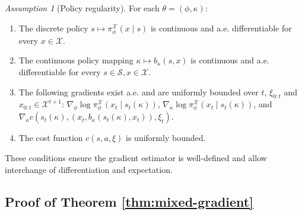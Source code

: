 \documentclass{article}
\theoremstyle{definition}
\theoremstyle{remark}
\newtheorem{assumption}{Assumption}
\begin{document}
\begin{assumption}[Policy regularity]
\label{ass:policy-regularity}
For each $\theta=(\phi,\kappa)$:
\begin{enumerate}
\vspace{-0.2cm}
\setlength{\itemsep}{2pt}
\setlength{\parskip}{0pt}
\setlength{\parsep}{0pt}
    \item The discrete policy $s \mapsto \pi^{\mathcal X}_{\phi}(x \mid s)$ is continuous and a.e. differentiable for every $x\in\mathcal X$.
    \item The continuous policy mapping $\kappa \mapsto b_\kappa(s, x)$ is continuous and a.e. differentiable for every $s \in \mathcal{S}, x\in\mathcal X$.
    \item The following gradients exist a.e. and are uniformly bounded over $t$, $\xi_{0:t}$ and $x_{0:t} \in \mathcal X^{t+1}$:
$\nabla_\phi \log \pi^{\mathcal X}_{\phi}(x_t \mid s_t(\kappa))$,
$\nabla_\kappa \log \pi^{\mathcal X}_{\phi}(x_t \mid s_t(\kappa))$, and
$\nabla_\kappa c(s_t(\kappa),(x_t,b_\kappa(s_t(\kappa),x_t)),\xi_t)$.
    \item The cost function $c(s,a,\xi)$ is uniformly bounded.
\end{enumerate}
\vspace{-0.25cm}
\end{assumption}
These conditions ensure the gradient estimator is well-defined and allow interchange of differentiation and expectation.

\subsection{Proof of Theorem \ref{thm:mixed-gradient}}
\label{appendix:hybrid-gradient-proof}
\end{document}
